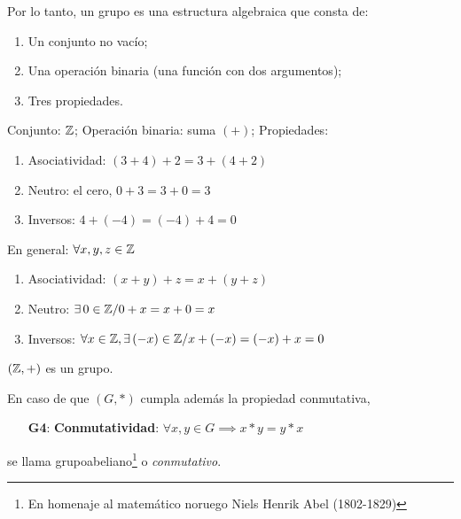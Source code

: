 Por lo tanto, un grupo es una estructura algebraica que consta de:
\begin{enumerate}[label=\alph*)]
	\item Un conjunto no vacío;
	\item Una operación binaria (una función con dos argumentos);
	\item Tres propiedades.
\end{enumerate}

\begin{fmd-example}
	Conjunto: $\mathbb{Z}$; Operación binaria: suma $(+)$; Propiedades:
	\begin{enumerate}
		\item Asociatividad: $(3 + 4) + 2 = 3 + (4 + 2)$
		\item Neutro: el cero, $0 + 3 = 3 + 0 = 3$
		\item Inversos: $4 + (-4) = (-4) + 4 = 0$
	\end{enumerate}
	En general: $\forall x, y, z \in \mathbb{Z}$
	\begin{enumerate}
		\item Asociatividad: $(x + y) + z = x + (y + z)$
		\item Neutro: $\exists \, 0 \in \mathbb{Z} / 0 + x = x + 0 = x$
		\item Inversos: $\forall x \in \mathbb{Z} , \exists \, (-x) \in \mathbb{Z} / x + (-x) = (-x) + x = 0$
	\end{enumerate}
	$(\mathbb{Z}, +)$ es un grupo.
\end{fmd-example}


\begin{fmd-definition} 
	En caso de que $(G, *)$ cumpla además la propiedad conmutativa,
	
	\begin{enumerate}
		\item[\textbf{G4}:] \textbf{Conmutatividad}: $\forall x, y \in G \implies x*y = y*x$
	\end{enumerate}
	se llama \gls{grupoabeliano}\footnote{En homenaje al matemático noruego Niels Henrik Abel (1802-1829)} o \textit{conmutativo}.
\end{fmd-definition}


